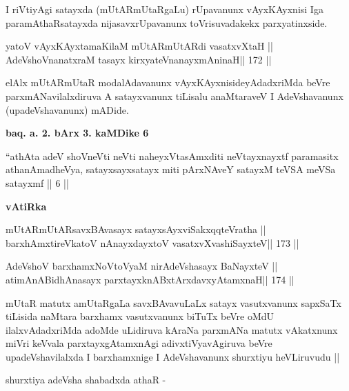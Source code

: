 \begin{artha}
I riVtiyAgi satayxda (mUtARmUtaRgaLu) rUpavanunx vAyxKAyxnisi Iga
paramAthaRsatayxda nijasavxrUpavanunx toVrisuvadakekx parxyatinxside.
\end{artha}

\begin{shl}
yatoV vAyxKAyxtamaKilaM mUtARmUtARdi vasatxvXtaH ||
AdeVshoV\s nanatxraM tasayx kirxyateV\s nanayxmAninaH\hfill || 172 ||
\end{shl}

\begin{artha}
elAlx mUtARmUtaR modalAdavanunx vAyxKAyxnisideyAdadxriMda beVre
parxmANavilalxdiruva A satayxvanunx tiLisalu anaMtaraveV I
AdeVshavanunx (upadeVshavanunx) mADide.
\end{artha}

\begin{center}
\textbf{baq. a. 2. bArx 3. kaMDike 6}
\end{center}

\begin{artha}
``athAta adeV shoVneVti neVti naheyxVtasAmxditi neVtayxnayxtf
  paramasitx athanAmadheVya, satayxsayxsatayx miti pArxNAveY satayxM
  teVSA meVSa satayxmf || 6 ||
\end{artha}

\begin{center}
\textbf{vAtiRka}
\end{center}

\begin{shl}
mUtARmUtARsavxBAvasayx satayxsAyx\s\s viSakxqqteVratha ||
barxhAmxtireVkatoV nAnayxdayxtoV vasatxvXvashiSayxteV\hfill || 173 ||
\end{shl}

\begin{shl}
AdeVshoV barxhamxNoV\s toV\s yaM nirAdeVshasayx BaNayxteV ||
atimAnABidhAnasayx parxtayxknABxtArxdavxyAtamxnaH\hfill || 174 ||
\end{shl}

\begin{artha}
mUtaR matutx amUtaRgaLa savxBAvavuLaLx satayx vasutxvanunx sapxSaTx
tiLisida naMtara barxhamx vasutxvanunx biTuTx beVre oMdU
ilalxvAdadxriMda adoMde uLidiruva kAraNa parxmANa matutx vAkatxnunx
miVri keVvala parxtayxgAtamxnAgi adivxtiVyavAgiruva beVre
upadeVshavilalxda I barxhamxnige I AdeVshavanunx shurxtiyu heVLiruvudu
||

shurxtiya adeVsha shabadxda athaR -
\end{artha}

